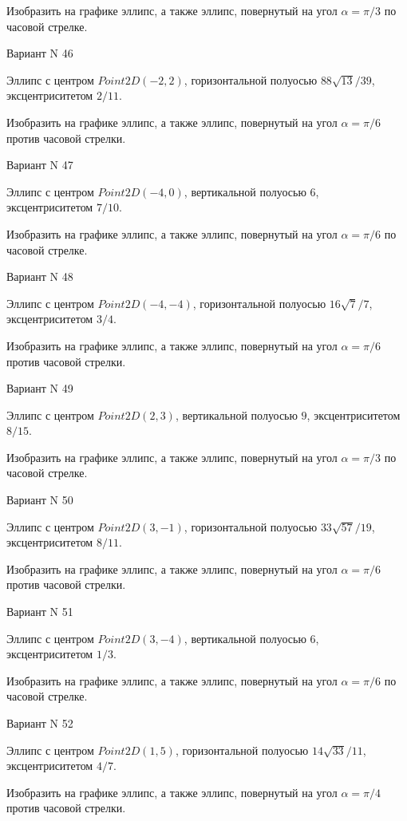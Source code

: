 \documentclass[11pt]{report}
\begin{document}
    Изобразить на графике эллипс, а также эллипс, повернутый на угол $\alpha = $$\pi / 3$ по часовой стрелке.

Вариант N 46

Эллипс с центром $Point2D\left(-2, 2\right)$, горизонтальной полуосью $88 \sqrt{13} / 39$, эксцентриситетом $2 / 11$.

    Изобразить на графике эллипс, а также эллипс, повернутый на угол $\alpha = $$\pi / 6$ против часовой стрелки.

Вариант N 47

Эллипс с центром $Point2D\left(-4, 0\right)$, вертикальной полуосью $6$, эксцентриситетом $7 / 10$.

    Изобразить на графике эллипс, а также эллипс, повернутый на угол $\alpha = $$\pi / 6$ по часовой стрелке.

Вариант N 48

Эллипс с центром $Point2D\left(-4, -4\right)$, горизонтальной полуосью $16 \sqrt{7} / 7$, эксцентриситетом $3 / 4$.

    Изобразить на графике эллипс, а также эллипс, повернутый на угол $\alpha = $$\pi / 6$ против часовой стрелки.

Вариант N 49

Эллипс с центром $Point2D\left(2, 3\right)$, вертикальной полуосью $9$, эксцентриситетом $8 / 15$.

    Изобразить на графике эллипс, а также эллипс, повернутый на угол $\alpha = $$\pi / 3$ по часовой стрелке.

Вариант N 50

Эллипс с центром $Point2D\left(3, -1\right)$, горизонтальной полуосью $33 \sqrt{57} / 19$, эксцентриситетом $8 / 11$.

    Изобразить на графике эллипс, а также эллипс, повернутый на угол $\alpha = $$\pi / 6$ против часовой стрелки.

Вариант N 51

Эллипс с центром $Point2D\left(3, -4\right)$, вертикальной полуосью $6$, эксцентриситетом $1 / 3$.

    Изобразить на графике эллипс, а также эллипс, повернутый на угол $\alpha = $$\pi / 6$ по часовой стрелке.

Вариант N 52

Эллипс с центром $Point2D\left(1, 5\right)$, горизонтальной полуосью $14 \sqrt{33} / 11$, эксцентриситетом $4 / 7$.

    Изобразить на графике эллипс, а также эллипс, повернутый на угол $\alpha = $$\pi / 4$ против часовой стрелки.
\end{document}

